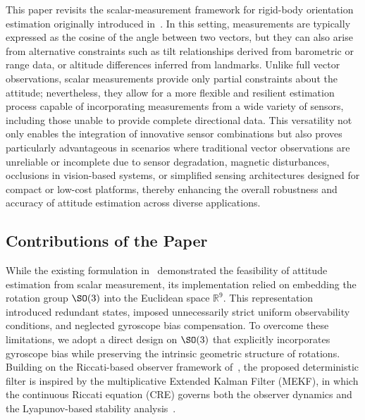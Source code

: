 This paper revisits the scalar-measurement framework for rigid-body orientation estimation originally introduced in~\cite{alnahhal2025scalar}. In this setting, measurements are typically expressed as the cosine of the angle between two vectors, but they can also arise from alternative constraints such as tilt relationships derived from barometric or range data, or altitude differences inferred from landmarks. Unlike full vector observations, scalar measurements provide only partial constraints about the attitude; nevertheless, they allow for a more flexible and resilient estimation process capable of incorporating measurements from a wide variety of sensors, including those unable to provide complete directional data. This versatility not only enables the integration of innovative sensor combinations but also proves particularly advantageous in scenarios where traditional vector observations are unreliable or incomplete due to sensor degradation, magnetic disturbances, occlusions in vision-based systems, or simplified sensing architectures designed for compact or low-cost platforms, thereby enhancing the overall robustness and accuracy of attitude estimation across diverse applications.

\subsection{Contributions of the Paper}
While the existing formulation in~\cite{alnahhal2025scalar} demonstrated the feasibility of attitude estimation from scalar measurement, its implementation relied on embedding the rotation group $\SO(3)$ into the Euclidean space $\mathbb{R}^9$. This representation introduced redundant states, imposed unnecessarily strict uniform observability conditions, and neglected gyroscope bias compensation. To overcome these limitations, we adopt a direct design on $\SO(3)$ that explicitly incorporates gyroscope bias while preserving the intrinsic geometric structure of rotations. Building on the Riccati-based observer framework of~\cite{hamel2018riccati}, the proposed deterministic filter is inspired by the multiplicative Extended Kalman Filter (MEKF), in which the continuous Riccati equation (CRE) governs both the observer dynamics and the Lyapunov-based stability analysis~\cite{hamel2017position}. 

